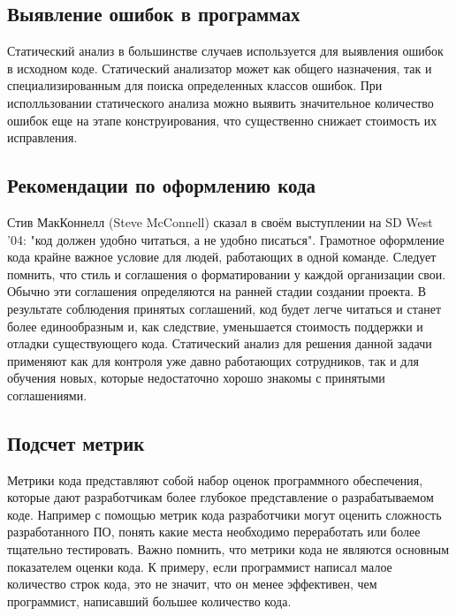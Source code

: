 \subsection {Выявление ошибок в программах}
Статический анализ в большинстве случаев используется для выявления ошибок в исходном коде.
Статический анализатор может как общего назначения, так и специализированным для поиска определенных 
классов ошибок. При исполльзовании статического анализа можно выявить значительное количество 
ошибок еще на этапе конструирования, что существенно снижает стоимость их исправления.
 

\subsection {Рекомендации по оформлению кода}
Стив МакКоннелл (Steve McConnell) сказал в своём выступлении на SD West '04: "код должен удобно 
читаться, а не удобно писаться". Грамотное оформление кода крайне важное условие для людей, работающих
в одной команде. Следует помнить, что стиль и соглашения о форматировании 
у каждой организации свои. Обычно эти соглашения определяются на ранней стадии создании проекта.
В результате соблюдения принятых соглашений, код будет легче читаться и станет более единообразным 
и, как следствие, уменьшается стоимость поддержки и отладки существующего кода.  
Статический анализ для решения данной задачи применяют как для контроля уже давно работающих сотрудников,
так и для обучения новых, которые недостаточно хорошо знакомы с принятыми соглашениями.

\subsection {Подсчет метрик}
Метрики кода представляют собой набор оценок программного обеспечения, которые дают разработчикам 
более глубокое представление о разрабатываемом коде.
Например с помощью метрик кода разработчики могут оценить сложность разработанного ПО,
понять какие места необходимо переработать или более тщательно тестировать. Важно помнить, что метрики
кода не являются основным показателем оценки кода. К примеру, если программист написал малое 
количество строк кода, это не значит, что он менее эффективен, чем программист, написавший большее количество кода.

